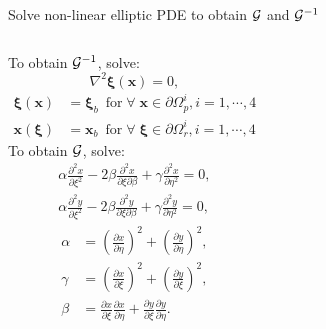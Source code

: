 \documentclass{beamer}
\begin{document}
\begin{frame}{Solve non-linear elliptic PDE to obtain $\mathcal{G}$ and $\mathcal{G}^{-1}$}
\begin{columns}[c]
To obtain $\mathcal{G}^{-1}$, solve:
\tiny
\begin{equation*}
\label{eqn:GInv}
\nabla^2\boldsymbol{\xi}(\mathbf{x}) = 0,
\end{equation*}
\begin{equation*}
\begin{split}
\label{eqn:GinvBC}
\boldsymbol{\xi}(\mathbf{x})&=\boldsymbol{\xi}_{b}\;\ \mathrm{for}\;\forall\;\mathbf{x}\in\partial\Omega_p^i, i = 1, \cdots, 4\\
\mathbf{x}(\boldsymbol{\xi})&=\mathbf{x}_{b}\;\ \mathrm{for}\;\forall\;\boldsymbol{\xi}\in\partial\Omega_r^i, i = 1, \cdots, 4 
\end{split}
\end{equation*}
\normalsize
To obtain $\mathcal{G}$, solve:
\tiny
\begin{equation*}
	\begin{split}
		\label{eqn:G}
		\alpha\frac{\partial^2x}{\partial\xi^2}-2\beta\frac{\partial^2x}{\partial\xi\partial\beta}+\gamma\frac{\partial^2x}{\partial\eta^2}=0,\\
		\alpha\frac{\partial^2y}{\partial\xi^2}-2\beta\frac{\partial^2y}{\partial\xi\partial\beta}+\gamma\frac{\partial^2y}{\partial\eta^2}=0,
	\end{split}
\end{equation*}
\begin{equation*}
\label{eqn:alphabetagamma}
\begin{split}
\alpha&=\left(\frac{\partial x}{\partial \eta}\right)^2+\left(\frac{\partial y}{\partial \eta}\right)^2,\\
\gamma&=\left(\frac{\partial x}{\partial \xi}\right)^2+\left(\frac{\partial y}{\partial \xi}\right)^2,\\
\beta&=\frac{\partial x}{\partial \xi}\frac{\partial x}{\partial \eta}+\frac{\partial y}{\partial \xi}\frac{\partial y}{\partial \eta}.
\end{split}
\end{equation*}


\end{columns}
\end{frame}
\end{document}
